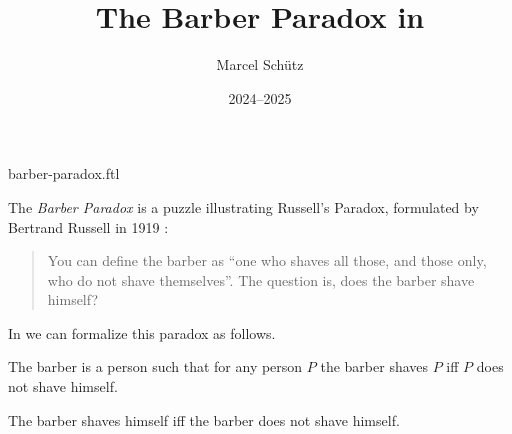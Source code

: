 \documentclass{stex}
\title{The Barber Paradox in \Naproche}
\author{Marcel Schütz}
\date{2024--2025}
\begin{document}
\begin{smodule}{barber-paradox.ftl}
\maketitle


\noindent The \emph{Barber Paradox} is a puzzle illustrating Russell's
Paradox, formulated by Bertrand Russell in 1919 \cite[p. 355]{Russell1919}:

\begin{quotation}
  \noindent You can define the barber as ``one who shaves all those, and 
  those only, who do not shave themselves''.
  The question is, does the barber shave himself?
\end{quotation}

\noindent In \Naproche we can formalize this paradox as follows.

\begin{forthel}
  \begin{signature*}
    The barber is a person such that for any person $P$ the barber shaves $P$ iff $P$ does not shave himself.
  \end{signature*}
  
  \begin{theorem*}[title=Barber Paradox,id=barber_paradox]
    The barber shaves himself iff the barber does not shave himself.
  \end{theorem*}
\end{forthel}

\printbibliography
{}
\end{smodule}
\end{document}
